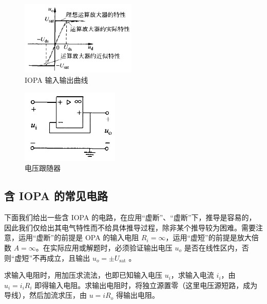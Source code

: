 \documentclass[UTF8]{report}
\theoremstyle{MyLineTheoremStyle} %
\theoremstyle{MyBlockTheoremStyle} %
\theoremstyle{MySubsubsectionStyle} %
\begin{document}
\begin{center}\noindent\begin{minipage}{0.4\textwidth}
        \begin{figure}[H]\centering
            \includegraphics[height=100pt]{assets/1,2/4323bb51980c2d4d8e127dfa2e8110d0.png}
            \caption{IOPA 输入输出曲线}\label{IOPA 输入输出曲线}
        \end{figure}
    \end{minipage}\begin{minipage}{0.49\textwidth}
        \begin{figure}[H]\centering
            \includegraphics[height=100pt]{assets/1,2/电压跟随器.png}
            \caption{电压跟随器}\label{电压跟随器}
        \end{figure}
\end{minipage}\end{center}

\subsection{含 IOPA 的常见电路}
下面我们给出一些含 IOPA 的电路，在应用“虚断”、“虚断”下，推导是容易的，因此我们仅给出其电气特性而不给具体推导过程，除非某个推导较为困难。需要注意，运用“虚断”的前提是 OPA 的输入电阻 $R_{i} = \infty$，运用“虚短”的前提是放大倍数 $A = \infty$。在实际应用或解题时，必须验证输出电压 $u_o$ 是否在线性区内，否则“虚短”不再成立，且输出  $u_o = \pm U_{\text{sat}}$ 。

求输入电阻时，用加压求流法，也即已知输入电压 $u_i$，求输入电流 $i_{i}$，由 $u_i = i_iR_i$ 即得输入电阻。求输出电阻时，将独立源置零（这里电压源短路，成为导线），然后加流求压，由 $u = iR_o$ 得输出电阻。

\end{document}
